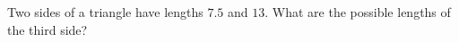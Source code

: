 Two sides of a triangle have lengths $7.5$ and $13$. What are the possible lengths of the third side?
